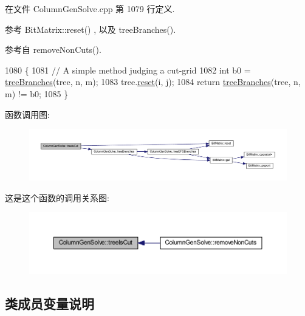 在文件 Column\+Gen\+Solve.\+cpp 第 1079 行定义.



参考 Bit\+Matrix\+::reset() , 以及 tree\+Branches().



参考自 remove\+Non\+Cuts().


\begin{DoxyCode}
1080 \{
1081     \textcolor{comment}{// A simple method judging a cut-grid}
1082     \textcolor{keywordtype}{int} b0 = \hyperlink{classColumnGenSolve_ac6a085a6c1704afde58891f19d1acf78}{treeBranches}(tree, n, m);
1083     tree.\hyperlink{classBitMatrix_a0ee870454e6343c3272ab791e45af404}{reset}(i, j);
1084     \textcolor{keywordflow}{return} \hyperlink{classColumnGenSolve_ac6a085a6c1704afde58891f19d1acf78}{treeBranches}(tree, n, m) != b0;
1085 \}
\end{DoxyCode}


函数调用图\+:
\nopagebreak
\begin{figure}[H]
\begin{center}
\leavevmode
\includegraphics[width=350pt]{classColumnGenSolve_ae971ef7c0098fd33bea1701fbfe92f4f_cgraph}
\end{center}
\end{figure}




这是这个函数的调用关系图\+:
\nopagebreak
\begin{figure}[H]
\begin{center}
\leavevmode
\includegraphics[width=350pt]{classColumnGenSolve_ae971ef7c0098fd33bea1701fbfe92f4f_icgraph}
\end{center}
\end{figure}




\subsection{类成员变量说明}
